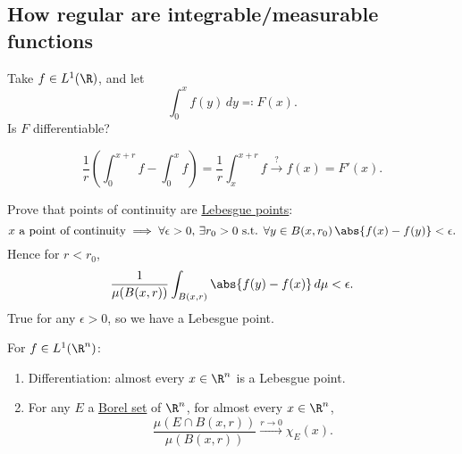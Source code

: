 \documentclass{article}
\begin{document}
\subsection{How regular are integrable/measurable functions}
Take $f \in L^1(\R)$, and let
\begin{equation*}
    \int_0^x f(y) \, dy \eqqcolon F(x).
\end{equation*}
Is $F$ differentiable?
\begin{remark}
    \begin{equation*}
        \frac{1}{r} \left(\int_0^{x+r} f - \int_0^x f\right) = \frac{1}{r} \int_x^{x+r} f \xrightarrow{?} f(x) = F'(x).
    \end{equation*}
\end{remark}
\begin{ex}
    Prove that points of continuity are \hyperlink{def:lebPoint}{Lebesgue points}:
    \begin{equation*}
        x \text{ a point of continuity} \implies \forall \epsilon > 0, \, \exists r_0 > 0 \text{ s.t. } \forall y \in B(x, r_0) \, \abs{f(x) - f(y)} < \epsilon.
    \end{equation*}
    Hence for $r < r_0$,
    \begin{equation*}
        \frac{1}{\mu(B(x, r))} \int_{B(x,r)} \abs{f(y) - f(x)} \, d\mu < \epsilon.
    \end{equation*}
    True for any $\epsilon>0$, so we have a Lebesgue point.
\end{ex}
\begin{thm}
    For $f \in L^1(\R^n)$:
    \begin{enumerate}[label=(\arabic*)]
        \item Differentiation: almost every $x \in \R^n$ is a Lebesgue point.
        \item For any $E$ a \hyperlink{def:borelSet}{Borel set} of $\R^n$, for almost every $x \in \R^n$,
            \begin{equation*}
                \frac{\mu(E \cap B(x, r))}{\mu(B(x, r))} \xrightarrow{r \to 0} \chi_E(x).
            \end{equation*}
    \end{enumerate}
\end{thm}
\end{document}
